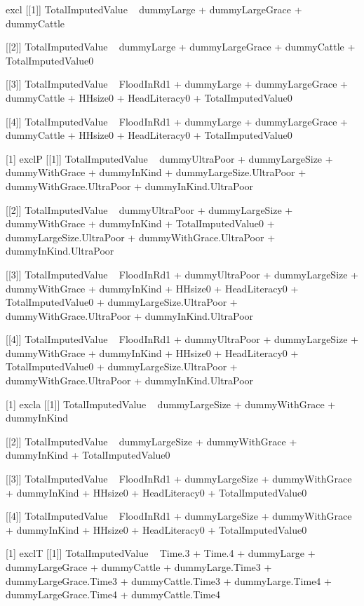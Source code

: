\begin{Schunk}
\begin{Soutput}
[1] excl
[[1]]
TotalImputedValue ~ dummyLarge + dummyLargeGrace + dummyCattle

[[2]]
TotalImputedValue ~ dummyLarge + dummyLargeGrace + dummyCattle + 
    TotalImputedValue0

[[3]]
TotalImputedValue ~ FloodInRd1 + dummyLarge + dummyLargeGrace + 
    dummyCattle + HHsize0 + HeadLiteracy0 + TotalImputedValue0

[[4]]
TotalImputedValue ~ FloodInRd1 + dummyLarge + dummyLargeGrace + 
    dummyCattle + HHsize0 + HeadLiteracy0 + TotalImputedValue0

[1] exclP
[[1]]
TotalImputedValue ~ dummyUltraPoor + dummyLargeSize + dummyWithGrace + 
    dummyInKind + dummyLargeSize.UltraPoor + dummyWithGrace.UltraPoor + 
    dummyInKind.UltraPoor

[[2]]
TotalImputedValue ~ dummyUltraPoor + dummyLargeSize + dummyWithGrace + 
    dummyInKind + TotalImputedValue0 + dummyLargeSize.UltraPoor + 
    dummyWithGrace.UltraPoor + dummyInKind.UltraPoor

[[3]]
TotalImputedValue ~ FloodInRd1 + dummyUltraPoor + dummyLargeSize + 
    dummyWithGrace + dummyInKind + HHsize0 + HeadLiteracy0 + 
    TotalImputedValue0 + dummyLargeSize.UltraPoor + dummyWithGrace.UltraPoor + 
    dummyInKind.UltraPoor

[[4]]
TotalImputedValue ~ FloodInRd1 + dummyUltraPoor + dummyLargeSize + 
    dummyWithGrace + dummyInKind + HHsize0 + HeadLiteracy0 + 
    TotalImputedValue0 + dummyLargeSize.UltraPoor + dummyWithGrace.UltraPoor + 
    dummyInKind.UltraPoor

[1] excla
[[1]]
TotalImputedValue ~ dummyLargeSize + dummyWithGrace + dummyInKind

[[2]]
TotalImputedValue ~ dummyLargeSize + dummyWithGrace + dummyInKind + 
    TotalImputedValue0

[[3]]
TotalImputedValue ~ FloodInRd1 + dummyLargeSize + dummyWithGrace + 
    dummyInKind + HHsize0 + HeadLiteracy0 + TotalImputedValue0

[[4]]
TotalImputedValue ~ FloodInRd1 + dummyLargeSize + dummyWithGrace + 
    dummyInKind + HHsize0 + HeadLiteracy0 + TotalImputedValue0

[1] exclT
[[1]]
TotalImputedValue ~ Time.3 + Time.4 + dummyLarge + dummyLargeGrace + 
    dummyCattle + dummyLarge.Time3 + dummyLargeGrace.Time3 + 
    dummyCattle.Time3 + dummyLarge.Time4 + dummyLargeGrace.Time4 + 
    dummyCattle.Time4


\end{Soutput}
\end{Schunk}
